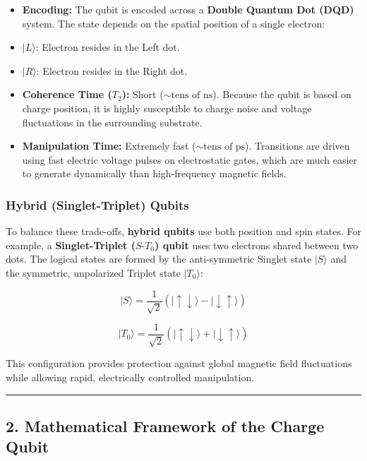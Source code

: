 \documentclass[
]{article}
\begin{document}
\begin{itemize}
\item
  \textbf{Encoding:} The qubit is encoded across a \textbf{Double
  Quantum Dot (DQD)} system. The state depends on the spatial position
  of a single electron:
\item
  \(|L\rangle\): Electron resides in the Left dot.
\item
  \(|R\rangle\): Electron resides in the Right dot.
\item
  \textbf{Coherence Time (\(T_2\)):} Short (\(\sim \text{tens of ns}\)).
  Because the qubit is based on charge position, it is highly
  susceptible to charge noise and voltage fluctuations in the
  surrounding substrate.
\item
  \textbf{Manipulation Time:} Extremely fast
  (\(\sim \text{tens of ps}\)). Transitions are driven using fast
  electric voltage pulses on electrostatic gates, which are much easier
  to generate dynamically than high-frequency magnetic fields.
\end{itemize}

\subsubsection{Hybrid (Singlet-Triplet)
Qubits}\label{hybrid-singlet-triplet-qubits}

To balance these trade-offs, \textbf{hybrid qubits} use both position
and spin states. For example, a \textbf{Singlet-Triplet
(\(S\text{-}T_0\)) qubit} uses two electrons shared between two dots.
The logical states are formed by the anti-symmetric Singlet state
\(|S\rangle\) and the symmetric, unpolarized Triplet state
\(|T_0\rangle\):

\[|S\rangle = \frac{1}{\sqrt{2}}(|\uparrow\downarrow\rangle - |\downarrow\uparrow\rangle)\]

\[|T_0\rangle = \frac{1}{\sqrt{2}}(|\uparrow\downarrow\rangle + |\downarrow\uparrow\rangle)\]

This configuration provides protection against global magnetic field
fluctuations while allowing rapid, electrically controlled manipulation.

\begin{center}\rule{0.5\linewidth}{0.5pt}\end{center}

\subsection{2. Mathematical Framework of the Charge
Qubit}\label{mathematical-framework-of-the-charge-qubit}
\end{document}
